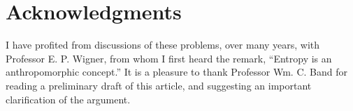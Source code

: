 \documentclass[twocolumn]{article}
\begin{document}
\section{Acknowledgments}\label{sec-acknowledgments}

I have profited from discussions of these problems, over many years,
with Professor E. P. Wigner, from whom I first heard the remark,
``Entropy is an anthropomorphic concept.'' It is a pleasure to thank
Professor Wm. C. Band for reading a preliminary draft of this article,
and suggesting an important clarification of the argument.


\end{document}
